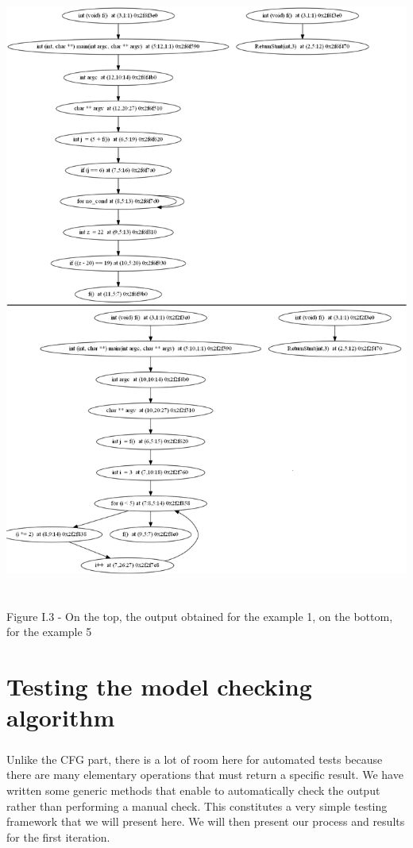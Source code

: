 \documentclass{report}
\begin{document}
\begin{center}
\includegraphics[scale=0.4]{data/for_example}
~\\~\\Figure I.3 - On the top, the output obtained for the example 1, on the bottom, for the example 5
\end{center}

\chapter{Testing the model checking algorithm}

\paragraph{}
\hspace{4mm}\textnormal{Unlike the CFG part, there is a lot of room here for automated tests because there are many elementary operations that must return a specific result. We have written some generic methods 
that enable to automatically check the output rather than performing a manual check. This constitutes a very simple 
testing framework that we will present here. We will then present our process and results for the first iteration.}
\end{document}
